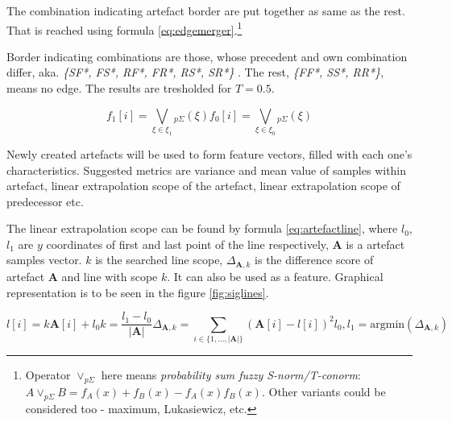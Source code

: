The combination indicating artefact border are put together as same as the rest. That is reached
using formula \ref{eq:edgemerger}.\footnote{Operator $\lor_{p\Sigma}$ here means
{\it probability sum fuzzy S-norm/T-conorm}: $A \lor_{p\Sigma} B = f_A(x) + f_B(x) - f_A(x)f_B(x)$.
Other variants could be considered too - maximum, Lukasiewicz, etc. }

Border indicating combinations are those, whose precedent and own combination differ, aka.
{\it \{SF*, FS*, RF*, FR*, RS*, SR*\} }. The rest, {\it \{FF*, SS*, RR*\}}, means no edge.
The results are tresholded for $T = 0.5$.

\begin{subequations}
\begin{equation}
f_{1}[i] = \bigvee\limits_{\xi \in \xi_1}{}_{p\Sigma} (\xi)
\end{equation}
\begin{equation}
f_{0}[i] = \bigvee\limits_{\xi \in \xi_0}{}_{p\Sigma} (\xi)
\end{equation}
\label{eq:edgemerger}
\end{subequations}


Newly created artefacts will be used to form feature vectors, filled with each one's characteristics.
Suggested metrics are variance and mean value of samples within artefact, linear extrapolation scope
of the artefact, linear extrapolation scope of predecessor etc.

The linear extrapolation scope can be found by formula \ref{eq:artefactline}, where $l_0$, $l_1$ are
$y$ coordinates of first and last point of the line respectively, \textbf{A} is a artefact samples vector.
$k$ is the searched line scope, $\Delta_{\textbf{A},k}$ is the difference score of artefact \textbf{A} and
line with scope $k$. It can also be used as a feature. Graphical representation is to be seen in the figure
\ref{fig:siglines}.

\begin{subequations}
\begin{equation}
l[i] = k\textbf{A}[i] + l_0
\end{equation}
\begin{equation}
k = \frac{l_1 - l_0}{|\textbf{A}|}
\end{equation}
\begin{equation}
\Delta _{\textbf{A},k} = \sum_{i \in \{1,...,|\textbf{A}|\}} (\textbf{A}[i]-l[i])^2
\end{equation}
\begin{equation}
l_0,l_1 = \text{argmin} ( \Delta_{\textbf{A},k} )
\end{equation}
\label{eq:artefactline}
\end{subequations}

